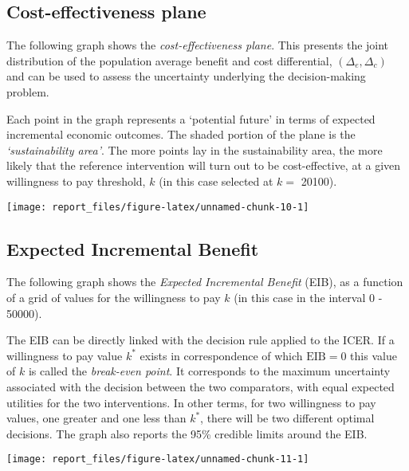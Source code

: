 \documentclass[
]{article}
\begin{document}
\hypertarget{cost-effectiveness-plane}{%
\subsection{Cost-effectiveness plane}\label{cost-effectiveness-plane}}

The following graph shows the \emph{cost-effectiveness plane}. This
presents the joint distribution of the population average benefit and
cost differential, \((\Delta_e,\Delta_c)\) and can be used to assess the
uncertainty underlying the decision-making problem.

Each point in the graph represents a `potential future' in terms of
expected incremental economic outcomes. The shaded portion of the plane
is the \emph{`sustainability area'}. The more points lay in the
sustainability area, the more likely that the reference intervention
will turn out to be cost-effective, at a given willingness to pay
threshold, \(k\) (in this case selected at \(k=\) 20100).

\begin{center}\texttt{[image: report\_files/figure-latex/unnamed-chunk-10-1]} \end{center}

\hypertarget{expected-incremental-benefit}{%
\subsection{Expected Incremental
Benefit}\label{expected-incremental-benefit}}

The following graph shows the \emph{Expected Incremental Benefit} (EIB),
as a function of a grid of values for the willingness to pay \(k\) (in
this case in the interval 0 - 50000).

The EIB can be directly linked with the decision rule applied to the
ICER. If a willingness to pay value \(k^*\) exists in correspondence of
which \(\mbox{EIB}=0\) this value of \(k\) is called the
\emph{break-even point}. It corresponds to the maximum uncertainty
associated with the decision between the two comparators, with equal
expected utilities for the two interventions. In other terms, for two
willingness to pay values, one greater and one less than \(k^*\), there
will be two different optimal decisions. The graph also reports the 95\%
credible limits around the EIB.

\begin{center}\texttt{[image: report\_files/figure-latex/unnamed-chunk-11-1]} \end{center}
\end{document}
